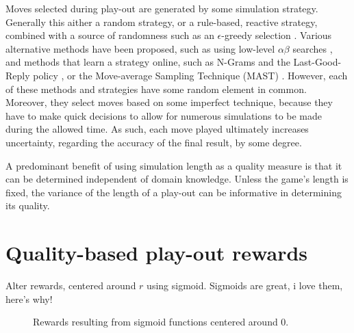 \documentclass{ecai2010}
\begin{document}
Moves selected during play-out are generated by some simulation strategy. Generally this aither a  random strategy, or a rule-based, reactive strategy, combined with a source of randomness such as an $\epsilon$-greedy selection \cite{sutton1998reinforcement, sturtevant2008analysis}. Various alternative methods have been proposed, such as using low-level $\alpha\beta$ searches \cite{winands2011a}, and methods that learn a strategy online, such as N-Grams and the Last-Good-Reply policy \cite{Tak2012}, or the Move-average Sampling Technique (MAST) \cite{finnsson2010learning}. However, each of these methods and strategies have some random element in common. Moreover, they select moves based on some imperfect technique, because they have to make quick decisions to allow for numerous simulations to be made during the allowed time. As such, each move played ultimately increases uncertainty, regarding the accuracy of the final result, by some degree.

A predominant benefit of using simulation length as a quality measure is that it can be determined independent of domain knowledge. Unless the game's length is fixed, the variance of the length of a play-out can be informative in determining its quality. 

\section{Quality-based play-out rewards}
\label{sec:qoreward}
Alter rewards, centered around $r$ using sigmoid. Sigmoids are great, i love them, here's why!
\begin{figure}[ht]
\centering
{}
    \caption{Rewards resulting from sigmoid functions centered around 0.}
	\label{fig:sigmoids}
\end{figure}
\end{document}
